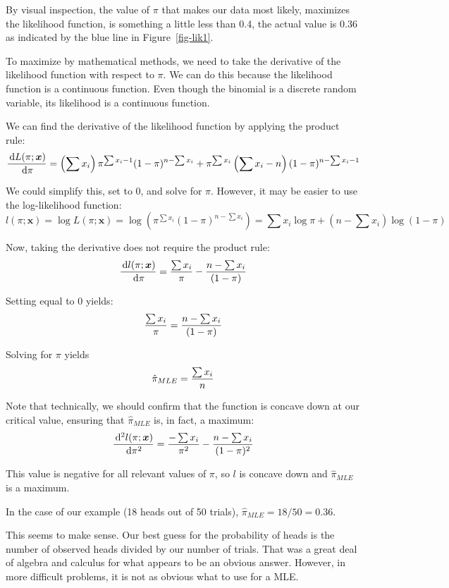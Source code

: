 \documentclass[
  letterpaper,
  DIV=11,
  numbers=noendperiod]{scrreprt}
\begin{document}
By visual inspection, the value of \(\pi\) that makes our data most
likely, maximizes the likelihood function, is something a little less
than 0.4, the actual value is 0.36 as indicated by the blue line in
Figure~\ref{fig-lik1}.

To maximize by mathematical methods, we need to take the derivative of
the likelihood function with respect to \(\pi\). We can do this because
the likelihood function is a continuous function. Even though the
binomial is a discrete random variable, its likelihood is a continuous
function.

We can find the derivative of the likelihood function by applying the
product rule: \[
{\,\mathrm{d}L(\pi;\boldsymbol{x})\over \,\mathrm{d}\pi} = \left(\sum x_i\right) \pi^{\sum x_i -1}(1-\pi)^{n-\sum x_i} + \pi^{\sum x_i}\left(\sum x_i -n\right)(1-\pi)^{n-\sum x_i -1}
\]

We could simplify this, set to 0, and solve for \(\pi\). However, it may
be easier to use the log-likelihood function: \[
l(\pi;\boldsymbol{x})=\log L(\pi;\boldsymbol{x})= \log \left(\pi^{\sum x_i}(1-\pi)^{n-\sum x_i}\right) = \sum x_i \log \pi + (n-\sum x_i)\log (1-\pi)
\]

Now, taking the derivative does not require the product rule: \[
{\,\mathrm{d}l(\pi;\boldsymbol{x})\over \,\mathrm{d}\pi}= {\sum x_i \over \pi} - {n-\sum x_i\over (1-\pi)}
\]

Setting equal to 0 yields: \[
{\sum x_i \over \pi} ={n-\sum x_i\over (1-\pi)}
\]

Solving for \(\pi\) yields \[
\hat{\pi}_{MLE}={\sum x_i \over n}
\]

Note that technically, we should confirm that the function is concave
down at our critical value, ensuring that \(\hat{\pi}_{MLE}\) is, in
fact, a maximum: \[
{\,\mathrm{d}^2 l(\pi;\boldsymbol{x})\over \,\mathrm{d}\pi^2}= {-\sum x_i \over \pi^2} - {n-\sum x_i\over (1-\pi)^2}
\]

This value is negative for all relevant values of \(\pi\), so \(l\) is
concave down and \(\hat{\pi}_{MLE}\) is a maximum.

In the case of our example (18 heads out of 50 trials),
\(\hat{\pi}_{MLE}=18/50=0.36\).

This seems to make sense. Our best guess for the probability of heads is
the number of observed heads divided by our number of trials. That was a
great deal of algebra and calculus for what appears to be an obvious
answer. However, in more difficult problems, it is not as obvious what
to use for a MLE.
\end{document}
